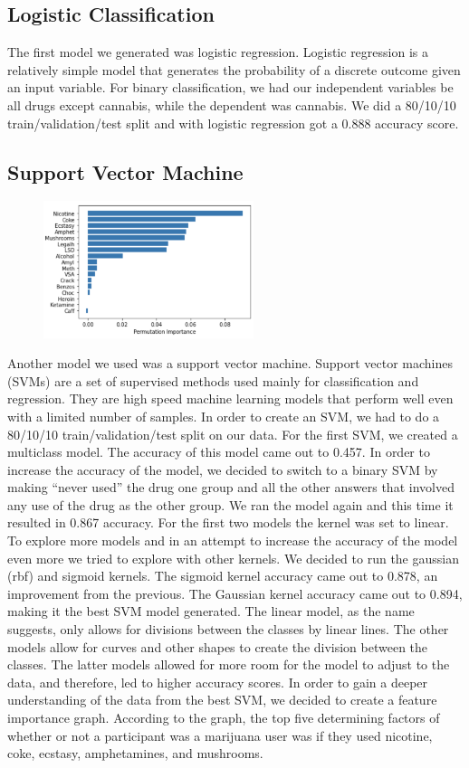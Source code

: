 \documentclass{article}
\begin{document}
\subsection{Logistic Classification}
\vspace*{-2mm}
The first model we generated was logistic regression. Logistic regression is a relatively simple model that generates the probability of a discrete outcome given an input variable. For binary classification, we had our independent variables be all drugs except cannabis, while the dependent was cannabis. We did a 80/10/10 train/validation/test split and with logistic regression got a 0.888 accuracy score. 
\vspace*{-4mm}
\subsection{Support Vector Machine}
\vspace*{-2mm}
\begin{figure}
  \centering
  \includegraphics[height=4cm]{Feature.png}
\end{figure}
Another model we used was a support vector machine. Support vector machines (SVMs) are a set of supervised methods used mainly for classification and regression. They are high speed machine learning models that perform well even with a limited number of samples. In order to create an SVM, we had to do a 80/10/10 train/validation/test split on our data. For the first SVM, we created a multiclass model. The accuracy of this model came out to 0.457. In order to increase the accuracy of the model, we decided to switch to a binary SVM by making “never used” the drug one group and all the other answers that involved any use of the drug as the other group. We ran the model again and this time it resulted in 0.867 accuracy. For the first two models the kernel was set to linear. To explore more models and in an attempt to increase the accuracy of the model even more we tried to explore with other kernels. We decided to run the gaussian (rbf) and sigmoid kernels. The sigmoid kernel accuracy came out to 0.878, an improvement from the previous. The Gaussian kernel accuracy came out to 0.894, making it the best SVM model generated. The linear model, as the name suggests, only allows for divisions between the classes by linear lines. The other models allow for curves and other shapes to create the division between the classes. The latter models allowed for more room for the model to adjust to the data, and therefore, led to higher accuracy scores. In order to gain a deeper understanding of the data from the best SVM, we decided to create a feature importance graph. According to the graph, the top five determining factors of whether or not a participant was a marijuana user was if they used nicotine, coke, ecstasy, amphetamines, and mushrooms.
\vspace*{-4mm}
\end{document}
